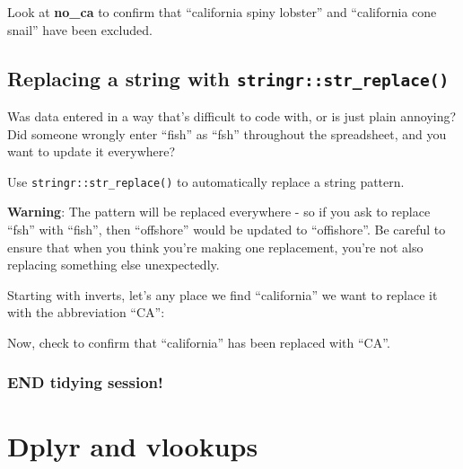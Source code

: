 \documentclass[]{book}
\newenvironment{Shaded}{\begin{snugshade}}{\end{snugshade}}
\newcommand{\DataTypeTok}[1]{\textcolor[rgb]{0.13,0.29,0.53}{#1}}
\newcommand{\KeywordTok}[1]{\textcolor[rgb]{0.13,0.29,0.53}{\textbf{#1}}}
\newcommand{\NormalTok}[1]{#1}
\newcommand{\OperatorTok}[1]{\textcolor[rgb]{0.81,0.36,0.00}{\textbf{#1}}}
\newcommand{\StringTok}[1]{\textcolor[rgb]{0.31,0.60,0.02}{#1}}
\begin{document}
Look at \textbf{no\_ca} to confirm that ``california spiny lobster'' and ``california cone snail'' have been excluded.

\hypertarget{replacing-a-string-with-stringrstr_replace}{%
\section{\texorpdfstring{Replacing a string with \texttt{stringr::str\_replace()}}{Replacing a string with stringr::str\_replace()}}\label{replacing-a-string-with-stringrstr_replace}}

Was data entered in a way that's difficult to code with, or is just plain annoying? Did someone wrongly enter ``fish'' as ``fsh'' throughout the spreadsheet, and you want to update it everywhere?

Use \texttt{stringr::str\_replace()} to automatically replace a string pattern.

\textbf{Warning}: The pattern will be replaced everywhere - so if you ask to replace ``fsh'' with ``fish'', then ``offshore'' would be updated to ``offishore''. Be careful to ensure that when you think you're making one replacement, you're not also replacing something else unexpectedly.

Starting with inverts, let's any place we find ``california'' we want to replace it with the abbreviation ``CA'':

\begin{Shaded}
\end{Shaded}

Now, check to confirm that ``california'' has been replaced with ``CA''.

\hypertarget{end-tidying-session}{%
\subsection{\texorpdfstring{END \textbf{tidying} session!}{END tidying session!}}\label{end-tidying-session}}

\hypertarget{vlookup}{%
\chapter{Dplyr and vlookups}\label{vlookup}}
\end{document}

